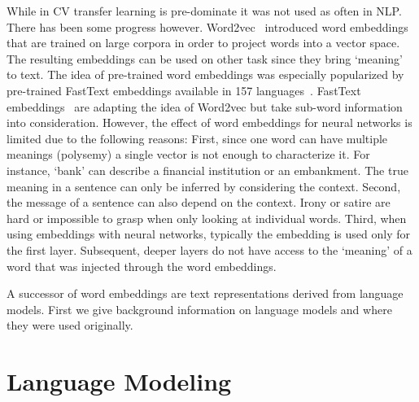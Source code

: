 While in CV transfer learning is pre-dominate it was not used as often in NLP. There has been some progress however. Word2vec~\cite{Mikolov:2013:DRW:2999792.2999959} introduced word embeddings that are trained on large corpora in order to project words into a vector space. The resulting embeddings can be used on other task since they bring `meaning' to text. The idea of pre-trained word embeddings was especially popularized by pre-trained FastText embeddings available in 157 languages~\cite{grave2018learning}. FastText embeddings~\cite{TACL999} are adapting the idea of Word2vec but take sub-word information into consideration. However, the effect of word embeddings for neural networks is limited due to the following reasons: First, since one word can have multiple meanings (polysemy) a single vector is not enough to characterize it. For instance, `bank' can describe a financial institution or an embankment. The true meaning in a sentence can only be inferred by considering the context. Second, the message of a sentence can also depend on the context. Irony or satire are hard or impossible to grasp when only looking at individual words. Third, when using embeddings with neural networks, typically the embedding is used only for the first layer. Subsequent, deeper layers do not have access to the `meaning' of a word that was injected through the word embeddings.

A successor of word embeddings are text representations derived from language models. First we give background information on language models and where they were used originally.

\section{Language Modeling}

